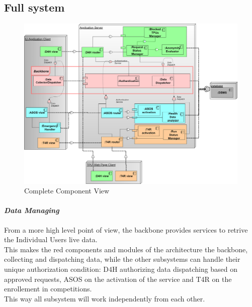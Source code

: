 \subsection{Full system}
\begin{figure}[H]
\label{fig:ComponentDiagram}
\caption{Complete Component View}
\centering
\includegraphics[width = \textwidth]{sections/architecturalDesign/ComponentDiagram.png}
\end{figure}
\paragraph{\textit{Data Managing}} From a more high level point of view, the backbone provides services to retrive the Individual Users live data. \\
This makes the red components and modules of the architecture the backbone, collecting and dispatching data, while the other subsystems can handle their unique authorization condition: D4H authorizing data dispatching based on approved requests, ASOS on the activation of the service and T4R on the enrollement in competitions. \\
This way all subsystem will work independently from each other.%
\clearpage
